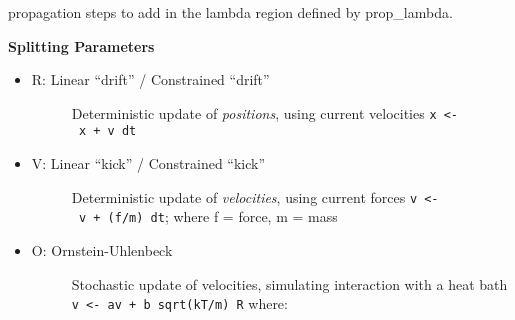 \begin{description}
\begin{description}
\begin{itemize}
  propagation steps to add in the lambda region defined by prop\_lambda.
\end{itemize}
\end{description}
\begin{description}
\item
    \textbf{Splitting Parameters}
\begin{itemize}
\item
  \begin{description}
  \item[R: Linear ``drift'' / Constrained ``drift'']
  Deterministic update of \emph{positions}, using current velocities
  \texttt{x\ \textless{}-\ x\ +\ v\ dt}
  \end{description}
\item
  \begin{description}
  \item[V: Linear ``kick'' / Constrained ``kick'']
  Deterministic update of \emph{velocities}, using current forces
  \texttt{v\ \textless{}-\ v\ +\ (f/m)\ dt}; where f = force, m = mass
  \end{description}
\item
  \begin{description}
  \item[O: Ornstein-Uhlenbeck]
  Stochastic update of velocities, simulating interaction with a heat
  bath \texttt{v\ \textless{}-\ av\ +\ b\ sqrt(kT/m)\ R} where:


\end{description}
\end{itemize}
\end{description}
\end{description}
